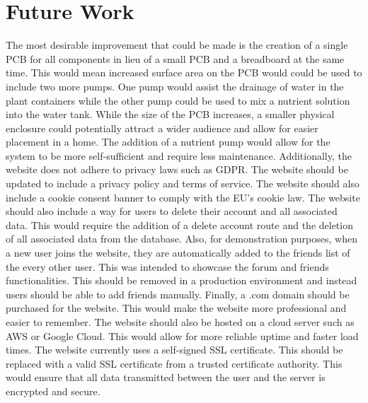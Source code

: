 \documentclass[12pt]{article} %
\begin{document}
\section{Future Work}
\noindent The most desirable improvement that could be made is the creation of a single PCB for all components in lieu of a small PCB and a breadboard at the same time. This would mean increased surface area on the PCB would could be used to include two more pumps. One pump would assist the drainage of water in the plant containers while the other pump could be used to mix a nutrient solution into the water tank. While the size of the PCB increases, a smaller physical enclosure could potentially attract a wider audience and allow for easier placement in a home. The addition of a nutrient pump would allow for the system to be more self-sufficient and require less maintenance.
\newline
\newline
\noindent Additionally, the website does not adhere to privacy laws such as GDPR. The website should be updated to include a privacy policy and terms of service. The website should also include a cookie consent banner to comply with the EU's cookie law. The website should also include a way for users to delete their account and all associated data. This would require the addition of a delete account route and the deletion of all associated data from the database. Also, for demonstration purposes, when a new user joins the website, they are automatically added to the friends list of the every other user. This was intended to showcase the forum and friends functionalities. This should be removed in a production environment and instead users should be able to add friends manually.
\newline
\newline
\noindent Finally, a .com domain should be purchased for the website. This would make the website more professional and easier to remember. The website should also be hosted on a cloud server such as AWS or Google Cloud. This would allow for more reliable uptime and faster load times. The website currently uses a self-signed SSL certificate. This should be replaced with a valid SSL certificate from a trusted certificate authority. This would ensure that all data transmitted between the user and the server is encrypted and secure.
\end{document}
